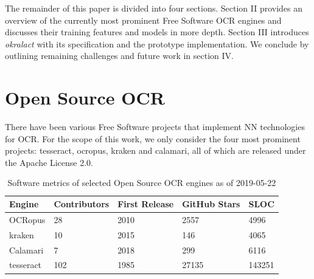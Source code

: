 \documentclass[conference]{IEEEtran}
\begin{document}


The remainder of this paper is divided into four sections. Section
II provides an overview of the currently most prominent Free
Software OCR engines and discusses their training features and models 
in more depth. Section III introduces \textit{okralact} with its
specification and the prototype implementation. We conclude by 
outlining remaining challenges and future work in section IV. 

\section{Open Source OCR}

There have been various Free Software projects that implement NN technologies
for OCR. For the scope of this work, we only consider the four most prominent projects: tesseract, ocropus, kraken and calamari, all of which are released under the Apache License 2.0.


\begin{table}[b]
\begin{tabular}{lllll}
\hline
Engine    & Contributors & First Release & GitHub Stars & SLOC \\ \hline
OCRopus   & 28           & 2010          & 2557         & 4996 \\
kraken    & 10           & 2015          & 146          & 4065 \\
Calamari  & 7            & 2018          & 299          & 6116 \\
tesseract & 102          & 1985          & 27135        & 143251 \\

\end{tabular}
\caption{Software metrics of selected Open Source OCR engines as of 2019-05-22}
\label{tab:stats}
\end{table}
\end{document}
